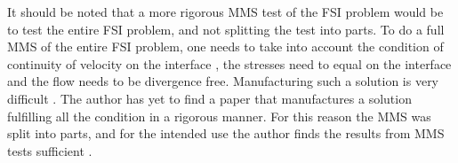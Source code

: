 It should be noted that a more rigorous MMS test of the FSI problem would be to test the entire FSI problem, and not splitting the test into parts. To do a full MMS of the entire FSI problem, one needs to take into account the condition of continuity of velocity on the interface \cite{Etienne2006}, the stresses need to equal on the interface and the flow needs to be divergence free. Manufacturing such a solution is very difficult \cite{Etienne2012}. The author has yet to find a paper that manufactures a solution fulfilling all the condition in a rigorous manner. For this reason the MMS was split into parts, and for the intended use the author finds the results from MMS tests sufficient .

